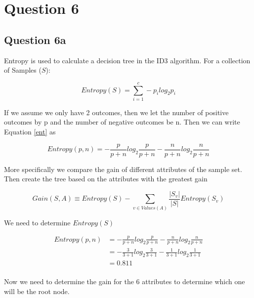 \documentclass[10pt,a4paper]{article}
\begin{document}
\section{Question 6}
\subsection{Question 6a}

Entropy is used to calculate a decision tree in the ID3 algorithm. For a collection of Samples ($S$):

\begin{equation}
\label{ent}
Entropy(S) = \sum_{i=1}^c -p_i log_2p_i
\end{equation}

If we assume we only have 2 outcomes, then we let the number of positive outcomes by p and the number of negative outcomes be n. Then we can write Equation \ref{ent} as

\begin{equation}
Entropy(p,n) = -\frac{p}{p+n}log_2\frac{p}{p+n} - \frac{n}{p+n}log_2\frac{n}{p+n} 
\end{equation}
 
More specifically we compare the gain of different attributes of the sample set. Then create the tree based on the attributes with the greatest gain

\begin{equation}
Gain(S,A) \equiv Entropy(S) - \sum_{v \in Values(A)} \frac{\vert S_v\vert}{\vert S\vert}Entropy(S_v)
\end{equation}

We need to determine $Entropy(S)$

\begin{equation}
\begin{split}
Entropy(p,n) &=  -\frac{p}{p+n}log_2\frac{p}{p+n} - \frac{n}{p+n}log_2\frac{n}{p+n}  \\
           &= -\frac{3}{3+1} log_2\frac{3}{3+1} -\frac{1}{3+1} log_2\frac{1}{3+1} \\
           &= 0.811   \\
\end{split}
\end{equation}

Now we need to determine the gain for the 6 attributes to determine which one will be the root node.
\end{document}

